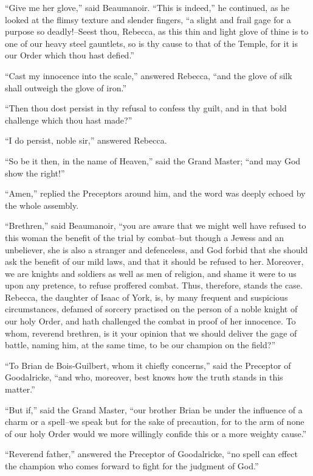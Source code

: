 ``Give me her glove,'' said Beaumanoir. ``This is indeed,'' he
continued, as he looked at the flimsy texture and slender fingers, ``a
slight and frail gage for a purpose so deadly!--Seest thou, Rebecca, as
this thin and light glove of thine is to one of our heavy steel
gauntlets, so is thy cause to that of the Temple, for it is our Order
which thou hast defied.''

``Cast my innocence into the scale,'' answered Rebecca, ``and the glove
of silk shall outweigh the glove of iron.''

``Then thou dost persist in thy refusal to confess thy guilt, and in
that bold challenge which thou hast made?''

``I do persist, noble sir,'' answered Rebecca.

``So be it then, in the name of Heaven,'' said the Grand Master; ``and
may God show the right!''

``Amen,'' replied the Preceptors around him, and the word was deeply
echoed by the whole assembly.

``Brethren,'' said Beaumanoir, ``you are aware that we might well have
refused to this woman the benefit of the trial by combat--but though a
Jewess and an unbeliever, she is also a stranger and defenceless, and
God forbid that she should ask the benefit of our mild laws, and that it
should be refused to her. Moreover, we are knights and soldiers as well
as men of religion, and shame it were to us upon any pretence, to refuse
proffered combat. Thus, therefore, stands the case. Rebecca, the
daughter of Isaac of York, is, by many frequent and suspicious
circumstances, defamed of sorcery practised on the person of a noble
knight of our holy Order, and hath challenged the combat in proof of her
innocence. To whom, reverend brethren, is it your opinion that we should
deliver the gage of battle, naming him, at the same time, to be our
champion on the field?''

``To Brian de Bois-Guilbert, whom it chiefly concerns,'' said the
Preceptor of Goodalricke, ``and who, moreover, best knows how the truth
stands in this matter.''

``But if,'' said the Grand Master, ``our brother Brian be under the
influence of a charm or a spell--we speak but for the sake of
precaution, for to the arm of none of our holy Order would we more
willingly confide this or a more weighty cause.''

``Reverend father,'' answered the Preceptor of Goodalricke, ``no spell
can effect the champion who comes forward to fight for the judgment of
God.''

